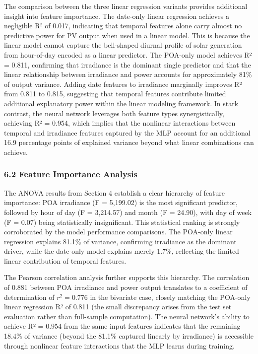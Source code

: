 \documentclass[
  11pt,
]{article}
\begin{document}
The comparison between the three linear regression variants provides
additional insight into feature importance. The date-only linear
regression achieves a negligible R² of 0.017, indicating that temporal
features alone carry almost no predictive power for PV output when used
in a linear model. This is because the linear model cannot capture the
bell-shaped diurnal profile of solar generation from hour-of-day encoded
as a linear predictor. The POA-only model achieves R² = 0.811,
confirming that irradiance is the dominant single predictor and that the
linear relationship between irradiance and power accounts for
approximately 81\% of output variance. Adding date features to
irradiance marginally improves R² from 0.811 to 0.815, suggesting that
temporal features contribute limited additional explanatory power within
the linear modeling framework. In stark contrast, the neural network
leverages both feature types synergistically, achieving R² = 0.954,
which implies that the nonlinear interactions between temporal and
irradiance features captured by the MLP account for an additional 16.9
percentage points of explained variance beyond what linear combinations
can achieve.

\subsubsection{6.2 Feature Importance
Analysis}\label{feature-importance-analysis}

The ANOVA results from Section 4 establish a clear hierarchy of feature
importance: POA irradiance (F = 5,199.02) is the most significant
predictor, followed by hour of day (F = 3,214.57) and month (F = 24.90),
with day of week (F = 0.07) being statistically insignificant. This
statistical ranking is strongly corroborated by the model performance
comparisons. The POA-only linear regression explains 81.1\% of variance,
confirming irradiance as the dominant driver, while the date-only model
explains merely 1.7\%, reflecting the limited linear contribution of
temporal features.

The Pearson correlation analysis further supports this hierarchy. The
correlation of 0.881 between POA irradiance and power output translates
to a coefficient of determination of \(r^2 = 0.776\) in the bivariate
case, closely matching the POA-only linear regression R² of 0.811 (the
small discrepancy arises from the test set evaluation rather than
full-sample computation). The neural network’s ability to achieve R² =
0.954 from the same input features indicates that the remaining 18.4\%
of variance (beyond the 81.1\% captured linearly by irradiance) is
accessible through nonlinear feature interactions that the MLP learns
during training.
\end{document}
